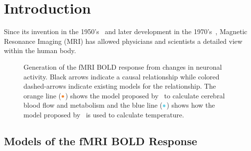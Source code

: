 \chapter{Introduction}



Since its invention in the 1950's~\citep{carr1954} and later development in the 1970's~\citep{lauterbur1973}, {M}agnetic {R}esonance {I}maging ({MRI}) has allowed physicians and scientists a detailed view within the human body.
  \begin{figure}[bt]
    \centering
    \vspace{10pt}
    
    \caption[Generation of the fMRI BOLD response and a corresponding temperature change]{\label{fig:flowchart} Generation of the fMRI BOLD response from changes in neuronal activity.  Black arrows indicate a causal relationship while colored dashed-arrows indicate existing models for the relationship.  The orange line ($\color{goldfish}\bullet$) shows the model proposed by~\citet{sotero2011} to calculate cerebral blood flow and metabolism and the blue line ($\color{aoi}\bullet$) shows how the model proposed by~\citet{collins} is used to calculate temperature.}
  \end{figure}
  
  \section{Models of the fMRI BOLD Response}
  \label{sec:BOLDmodeling}
